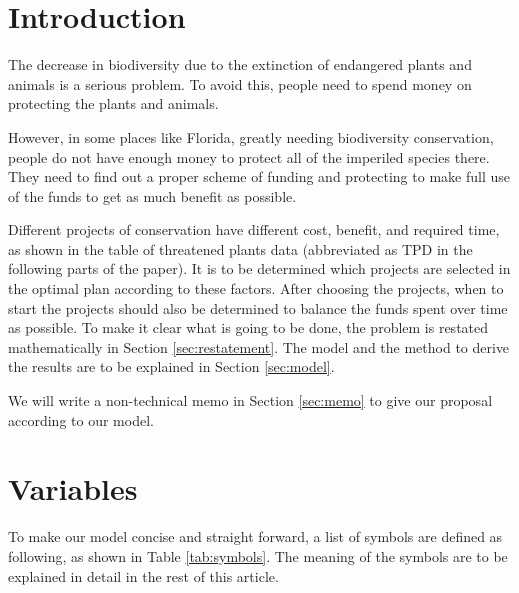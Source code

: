 \documentclass{article}
\begin{document}
\newpage
\section{Introduction}
\label{sec:intro}

The decrease in biodiversity due to the extinction of endangered plants and animals is a serious problem.
To avoid this, people need to spend money on protecting the plants and animals.

However, in some places like Florida, greatly needing biodiversity conservation,
people do not have enough money to protect all of the imperiled species there.
They need to find out a proper scheme of funding and protecting to make full use of the funds to get as much benefit as possible.

Different projects of conservation have different cost, benefit, and required time,
as shown in the table of threatened plants data (abbreviated as TPD in the following parts of the paper).
It is to be determined which projects are selected in the optimal plan according to these factors.
After choosing the projects, when to start the projects should also be determined to balance the funds spent over time as possible.
To make it clear what is going to be done, the problem is restated mathematically in Section \ref{sec:restatement}.
The model and the method to derive the results are to be explained in Section \ref{sec:model}.

We will write a non-technical memo in Section \ref{sec:memo} to give our proposal according to our model.


\section{Variables}

To make our model concise and straight forward, a list of symbols are defined as following, as shown in Table \ref{tab:symbols}.
The meaning of the symbols are to be explained in detail in the rest of this article.
\end{document}
